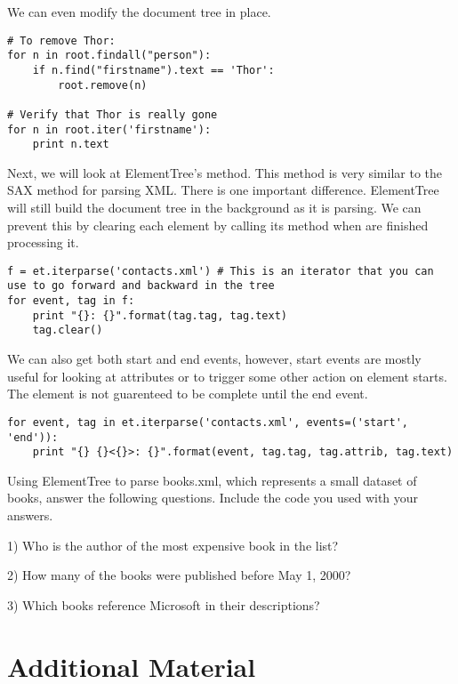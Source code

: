 We can even modify the document tree in place.
\begin{lstlisting}
# To remove Thor:
for n in root.findall("person"):
    if n.find("firstname").text == 'Thor':
        root.remove(n)

# Verify that Thor is really gone
for n in root.iter('firstname'):
    print n.text
\end{lstlisting}

Next, we will look at ElementTree's  method.
This method is very similar to the SAX method for parsing XML.
There is one important difference.
ElementTree will still build the document tree in the background as it is parsing.
We can prevent this by clearing each element by calling its  method when are finished processing it.
\begin{lstlisting}
f = et.iterparse('contacts.xml') # This is an iterator that you can use to go forward and backward in the tree
for event, tag in f:
    print "{}: {}".format(tag.tag, tag.text)
    tag.clear()
\end{lstlisting}

We can also get both start and end events, however, start events are mostly useful for looking at attributes or to trigger some other action on element starts.
The element is not guarenteed to be complete until the end event.
\begin{lstlisting}
for event, tag in et.iterparse('contacts.xml', events=('start', 'end')):
    print "{} {}<{}>: {}".format(event, tag.tag, tag.attrib, tag.text)
\end{lstlisting}

\begin{problem}
Using ElementTree to parse books.xml, which represents a small dataset of books, answer the following questions. Include the code you used with your answers.

1) Who is the author of the most expensive book in the list?

2) How many of the books were published before May 1, 2000?

3) Which books reference Microsoft in their descriptions?
\end{problem}


\newpage

\section*{Additional Material} 



